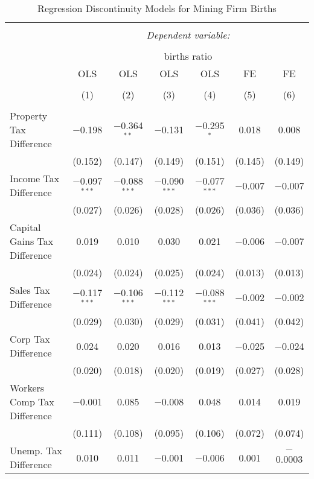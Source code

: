 
\begin{table}[!htbp] \centering 
  \caption{Regression Discontinuity Models for  Mining Firm Births} 
  \label{21rd} 
\footnotesize 
\begin{tabular}{@{\extracolsep{5pt}}lcccccc} 
\\[-1.8ex]\hline 
\hline \\[-1.8ex] 
 & \multicolumn{6}{c}{\textit{Dependent variable:}} \\ 
\cline{2-7} 
\\[-1.8ex] & \multicolumn{6}{c}{births ratio} \\ 
 & OLS & OLS & OLS & OLS & FE & FE \\ 
\\[-1.8ex] & (1) & (2) & (3) & (4) & (5) & (6)\\ 
\hline \\[-1.8ex] 
 Property Tax Difference & $-$0.198 & $-$0.364$^{**}$ & $-$0.131 & $-$0.295$^{*}$ & 0.018 & 0.008 \\ 
  & (0.152) & (0.147) & (0.149) & (0.151) & (0.145) & (0.149) \\ 
  Income Tax Difference & $-$0.097$^{***}$ & $-$0.088$^{***}$ & $-$0.090$^{***}$ & $-$0.077$^{***}$ & $-$0.007 & $-$0.007 \\ 
  & (0.027) & (0.026) & (0.028) & (0.026) & (0.036) & (0.036) \\ 
  Capital Gains Tax Difference & 0.019 & 0.010 & 0.030 & 0.021 & $-$0.006 & $-$0.007 \\ 
  & (0.024) & (0.024) & (0.025) & (0.024) & (0.013) & (0.013) \\ 
  Sales Tax Difference & $-$0.117$^{***}$ & $-$0.106$^{***}$ & $-$0.112$^{***}$ & $-$0.088$^{***}$ & $-$0.002 & $-$0.002 \\ 
  & (0.029) & (0.030) & (0.029) & (0.031) & (0.041) & (0.042) \\ 
  Corp Tax Difference & 0.024 & 0.020 & 0.016 & 0.013 & $-$0.025 & $-$0.024 \\ 
  & (0.020) & (0.018) & (0.020) & (0.019) & (0.027) & (0.028) \\ 
  Workers Comp Tax Difference & $-$0.001 & 0.085 & $-$0.008 & 0.048 & 0.014 & 0.019 \\ 
  & (0.111) & (0.108) & (0.095) & (0.106) & (0.072) & (0.074) \\ 
  Unemp. Tax Difference & 0.010 & 0.011 & $-$0.001 & $-$0.006 & 0.001 & $-$0.0003 \\ 

\end{tabular}
\end{table}
